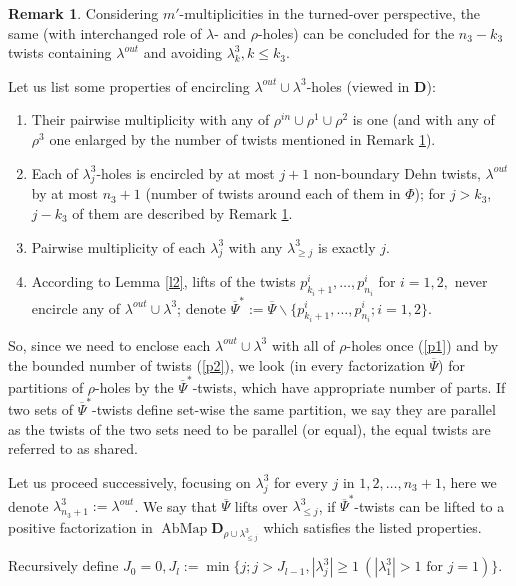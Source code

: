 \documentclass{amsart}
\theoremstyle{definition}
\newtheorem{remark}[thm]{Remark}
\begin{document}
\begin{remark}\label{r2} 
Considering $m'$-multiplicities in the turned-over perspective, the same (with interchanged role of $\lambda$- and $\rho$-holes) can be concluded for the $n_3-k_3$ twists containing $\lambda^{out}$ and avoiding $\lambda_k^3,k\leq k_3$.
\end{remark}

Let us list some properties of encircling $\lambda^{out}\cup\lambda^3$-holes (viewed in $\mathbf D$):
\begin{enumerate}[leftmargin=.6cm]
\item\label{p1} Their pairwise multiplicity with any of $\rho^{in}\cup\rho^1\cup\rho^2$ is one (and with any of $\rho^3$ one enlarged by the number of twists mentioned in Remark \ref{r2}). 
\item\label{p2} Each of $\lambda_j^3$-holes is encircled by at most $j+1$ non-boundary Dehn twists, $\lambda^{out}$ by at most $n_3+1$ (number of twists around each of them in $\Phi$); for $j>k_3$, $j-k_3$ of them are described by Remark \ref{r2}. 
\item\label{p3} Pairwise multiplicity of each $\lambda_j^3$ with any $\lambda_{\geq j}^3$ is exactly $j$.
\item\label{p4} According to Lemma \ref{l2}, lifts of the twists $p_{k_i+1}^i,\dots,p_{n_i}^i$ for $i=1,2,$ never encircle any of $\lambda^{out}\cup\lambda^3$; denote $\overline\Psi^*:=\overline\Psi\backslash\{p_{k_i+1}^i,\dots,p_{n_i}^i;i=1,2\}$.
\end{enumerate}

So, since we need to enclose each $\lambda^{out}\cup\lambda^3$ with all of $\rho$-holes once (\ref{p1}) and by the bounded number of twists (\ref{p2}), we look (in every factorization $\overline\Psi$) for partitions of $\rho$-holes by the $\overline\Psi^*$-twists, which have appropriate number of parts. If two sets of $\overline\Psi^*$-twists define set-wise the same partition, we say they are parallel as the twists of the two sets need to be parallel (or equal), the equal twists are referred to as shared.

Let us proceed successively, focusing on $\lambda_j^3$ for every $j$ in $1,2,\dots,n_3+1$, here we denote $\lambda_{n_3+1}^3:=\lambda^{out}$. We say that $\overline\Psi$ lifts over $\lambda_{\leq j}^3$, if $\overline\Psi^*$-twists can be lifted to a positive factorization in $\operatorname{AbMap} \mathbf D_{\rho\cup\lambda_{\leq j}^3}$ which satisfies the listed properties.

Recursively define $J_0=0, J_l:=\min\{j;j>J_{l-1},|\lambda_j^3|\geq1\ (|\lambda_1^3|>1\text{ for }j=1)\}.$
\end{document}
